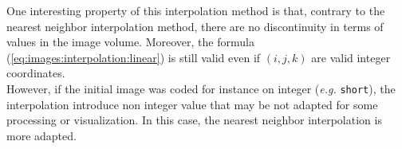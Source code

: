 %
One interesting property of this interpolation method is that, contrary to the nearest neighbor interpolation method, there are no discontinuity in terms of values in the image volume. Moreover, the formula (\ref{eq:images:interpolation:linear}) is still valid even if $(i,j,k)$ are valid integer coordinates.
\\
However, if the initial image was coded for instance on integer (\textit{e.g.} \texttt{short}), the interpolation introduce non integer value that may be not adapted for some processing or visualization. In this case, the nearest neighbor interpolation is more adapted.




